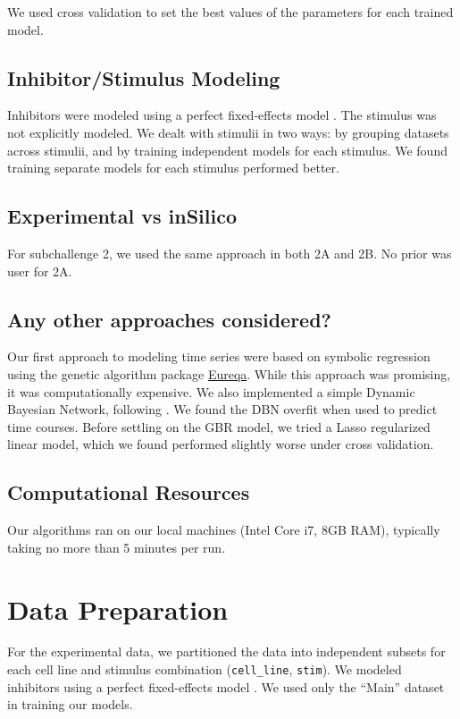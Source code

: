 \documentclass[letterpaper, 11pt]{article}
\begin{document}
We used cross validation to set the best values of the parameters for each trained model.

\subsection{Inhibitor/Stimulus Modeling}

Inhibitors were modeled using a perfect fixed-effects model \citep{Spencer2012}. The stimulus was not explicitly modeled. We dealt with stimulii in two ways: by grouping datasets across stimulii, and by training independent models for each stimulus. We found training separate models for each stimulus performed better.

\subsection{Experimental vs inSilico}

For subchallenge 2, we used the same approach in both 2A and 2B. No prior was user for 2A.

\subsection{Any other approaches considered?}

Our first approach to modeling time series were based on symbolic regression using the genetic algorithm package \href{http://creativemachines.cornell.edu/eureqa}{Eureqa}. While this approach was promising, it was computationally expensive. We also implemented a simple Dynamic Bayesian Network, following \citep{Hill2012}. We found the DBN overfit when used to predict time courses. Before settling on the GBR model, we tried a Lasso regularized linear model, which we found performed slightly worse under cross validation.

\subsection{Computational Resources}

Our algorithms ran on our local machines (Intel Core i7, 8GB RAM), typically taking no more than 5 minutes per run.

\section{Data Preparation}

For the experimental data, we partitioned the data into independent subsets for each cell line and stimulus combination (\texttt{cell\_line}, \texttt{stim}). We modeled inhibitors using a perfect fixed-effects model \citep{Spencer2012}. We used only the ``Main'' dataset in training our models.
\end{document}
